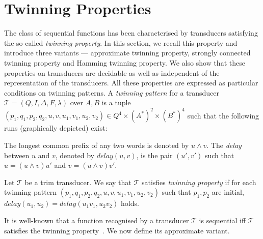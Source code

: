 \documentclass[a4paper,UKenglish,cleveref, autoref, thm-restate,authorcolumns, colorlinks]{lipics-v2021}
\newcommand\calT{\mathcal{T}}
\newcommand\delay{\mathit{delay}}
\newcommand{\TP}[0]{\textbf{TP}}
\begin{document}
\section{Twinning Properties}
 The class of sequential functions has been characterised by transducers satisfying the so called \emph{twinning property}. In this section, we recall this property and introduce three variants --- approximate twinning property, strongly connected twinning property and Hamming twinning property. We also show that these properties on transducers are decidable as well as independent of the representation of the transducers.
All these properties are expressed as particular conditions on twinning patterns. A \emph{twinning pattern} for a transducer $\calT = (Q, I, \Delta, F, \lambda)$ over $A,B$ is a tuple $(p_1,q_1,p_2,q_2,u,v,u_1,v_1,u_2,v_2)\in Q^4\times (A^*)^2 \times (B^*)^4$ such that the following runs (graphically depicted) exist:
\begin{center}
\end{center}

The longest common prefix of any two words is denoted by $u\wedge v$. The \emph{delay} between $u$ and $v$, denoted by $\delay(u,v)$, is the pair $(u',v')$ such that $u = (u\wedge v)u'$ and $v=(u\wedge v)v'$.

\begin{definition}[Twinning Property (\TP)]\label{def:tp}
    Let $\calT$ be a trim transducer.
    We say that $\calT$ satisfies \emph{twinning property} if for each twinning pattern
    $(p_1,q_1,p_2,q_2,u,v,u_1,v_1,u_2,v_2)$ such that $p_1,p_2$ are initial,   $\delay(u_1,u_2) = \delay(u_1v_1,u_2v_2)$ holds. 
\end{definition}

It is well-known that a function recognised by a transducer $\calT$ is sequential iff $\calT$ satisfies the twinning property~\cite{DBLP:journals/tcs/Choffrut77,twinningproperty}. We now define its approximate variant.
\end{document}
